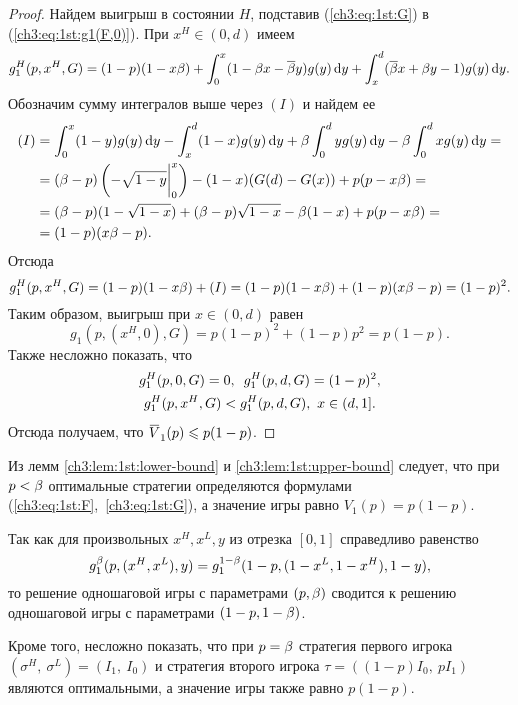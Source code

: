 {\begin{proof}
  Найдем выигрыш в состоянии $H$, подставив (\ref{ch3:eq:1st:G}) в (\ref{ch3:eq:1st:g1(F,0)}).
  При $x^H \in (0, d)$ имеем
  \begin{multline*}
    g^H_1(p, x^H, G) = (1 - p)(1 - x\beta) + \int_0^x (1 - \beta x - {{\overline{\beta}}} y) g(y) \mathop{}\!\mathrm{d} y + \int_x^d ({{\overline{\beta}}} x + \beta y - 1) g(y) \mathop{}\!\mathrm{d} y. 
  \end{multline*}
  Обозначим сумму интегралов выше через $(I)$ и найдем ее
  \begin{align*}
    (I)
    &= \int_0^x (1-y) g(y) \mathop{}\!\mathrm{d} y - \int_x^d (1-x) g(y) \mathop{}\!\mathrm{d} y + \beta \int_0^d y g(y) \mathop{}\!\mathrm{d} y - \beta \int_0^d x g(y) \mathop{}\!\mathrm{d} y = \\
    &= (\beta - p)\left(-\sqrt{1-y}\bigg|_0^x\right) - (1 - x)(G(d) - G(x)) + p(p - x\beta) = \\
    &= (\beta - p)(1 - \sqrt{1-x}) + (\beta - p)\sqrt{1-x} - \beta (1 - x) + p(p - x\beta) = \\
    &= (1 - p)(x\beta - p).
  \end{align*}
  Отсюда
  \begin{equation*}
    g^H_1(p, x^H, G) = (1 - p)(1 - x\beta) + (I) = (1 - p)(1 - x\beta) + (1 - p)(x\beta - p) = (1 - p)^2.
  \end{equation*}
  Таким образом, выигрыш при $x \in (0, d)$ равен
  \begin{equation*}
    g_1(p, (x^H, 0), G) = p (1 - p)^2 + (1 - p) p^2 = p (1 - p).
  \end{equation*}
  Также несложно показать, что 
  \begin{gather*}
    g^H_1(p, 0, G) = 0,\enskip
    g^H_1(p, d, G) = (1 - p)^2, \\
    g^H_1(p, x^H, G) < g^H_1(p, d, G),\ x \in (d, 1].
  \end{gather*}
  Отсюда получаем, что $\HV{1}(p) \leq p(1-p)$.
\end{proof}

Из лемм \ref{ch3:lem:1st:lower-bound} и \ref{ch3:lem:1st:upper-bound} следует, что при $p < \beta$ оптимальные стратегии определяются формулами (\ref{ch3:eq:1st:F},~\ref{ch3:eq:1st:G}), а значение игры равно $V_1(p) = p(1-p)$.

Так как для произвольных $x^H, x^L, y$ из отрезка $[0, 1]$ справедливо равенство
\[
  g^{\beta}_1(p, (x^H, x^L), y) = g^{1-\beta}_1(1 - p, (1 - x^L, 1 - x^H), 1 - y),
\]
то решение одношаговой игры с параметрами $(p, \beta)$ сводится к решению одношаговой игры с параметрами $(1 - p, 1 - \beta)$.

Кроме того, несложно показать, что при $p = \beta$ стратегия первого игрока $(\sigma^H,\ \sigma^L) = (I_1,\ I_0)$ и стратегия второго игрока $\tau = \left( (1-p) I_0,\ p I_1 \right)$ являются оптимальными, а значение игры также равно $p(1-p)$.

}
